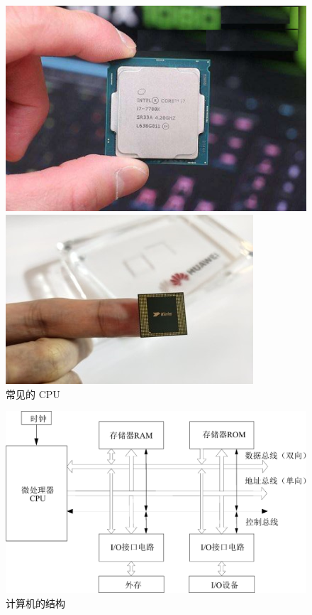 \begin{figure}[ht]
	\centering
	\begin{minipage}{0.45\linewidth}
		\centering
		\includegraphics[width=0.95\linewidth]{pic/cpu-1.png}
	\end{minipage}
	\begin{minipage}{0.45\linewidth}
		\centering
		\includegraphics[width=0.95\linewidth]{pic/cpu-2.png}
	\end{minipage}
	\caption{常见的 CPU}
	\label{pic:cpu}
\end{figure}

\begin{figure}[ht]
	\centering
	\includegraphics[width=0.8\linewidth]{pic/computer.pdf}
	\caption{计算机的结构}
	\label{pic:computer}
\end{figure}

